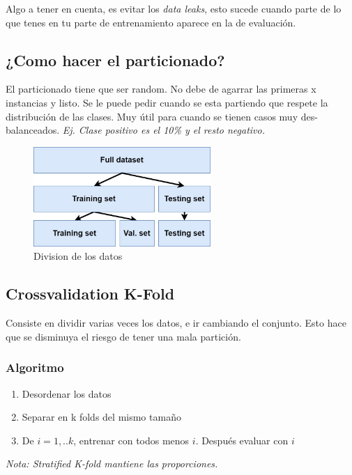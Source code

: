 \documentclass[titlepage,a4paper]{article}
\begin{document}
Algo a tener en cuenta, es evitar los \textit{data leaks}, esto sucede cuando parte de lo que tenes en tu parte de entrenamiento aparece en la de evaluación.

\subsection{¿Como hacer el particionado?}

El particionado tiene que ser random. No debe de agarrar las primeras x instancias y listo. Se le puede pedir cuando se esta partiendo que respete la distribución de las clases. Muy útil para cuando se tienen casos muy des-balanceados. \textit{Ej. Clase positivo es el 10\% y el resto negativo.}

\begin{figure}[!htb]
    \centering
    \includegraphics[width=0.6\textwidth]{imagenesResumen/TrainTestSplit.jpg}
    \caption{Division de los datos}
\end{figure}

\subsection{Crossvalidation K-Fold}

Consiste en dividir varias veces los datos, e ir cambiando el conjunto. Esto hace que se disminuya el riesgo de tener una mala partición.

\subsubsection*{Algoritmo}
\begin{enumerate}
    \item Desordenar los datos
    \item Separar en k folds del mismo tamaño
    \item De $i = 1,..k$, entrenar con todos menos $i$. Después evaluar con $i$  
\end{enumerate}

\textit{Nota: Stratified K-fold mantiene las proporciones.}
\end{document}
